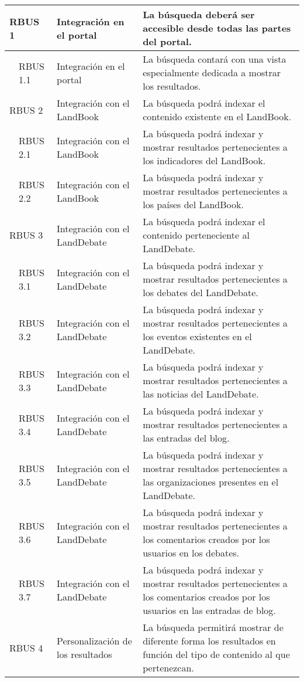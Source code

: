 \begin{longtable}[c]{|p{1mm}|p{14mm}|p{30mm}|p{90mm}|}
\multicolumn{2}{|l|}{RBUS 1}  & Integración en el portal & La búsqueda deberá ser accesible desde todas las partes del portal. \\
\hline
 & RBUS 1.1 & Integración en el portal & La búsqueda contará con una vista especialmente dedicada a mostrar los resultados. \\
\hline
\multicolumn{2}{|l|}{RBUS 2}  & Integración con el LandBook & La búsqueda podrá indexar el contenido existente en el LandBook. \\
\hline
& RBUS 2.1 & Integración con el LandBook & La búsqueda podrá indexar y mostrar resultados pertenecientes a los indicadores del LandBook. \\
\hline
& RBUS 2.2 & Integración con el LandBook & La búsqueda podrá indexar y mostrar resultados pertenecientes a los países del LandBook. \\
\hline
\multicolumn{2}{|l|}{RBUS 3}  & Integración con el LandDebate & La búsqueda podrá indexar el contenido perteneciente al LandDebate. \\
\hline
& RBUS 3.1 & Integración con el LandDebate & La búsqueda podrá indexar y mostrar resultados pertenecientes a los debates del LandDebate. \\
\hline
& RBUS 3.2 & Integración con el LandDebate & La búsqueda podrá indexar y mostrar resultados pertenecientes a los eventos existentes en el LandDebate. \\
\hline
& RBUS 3.3 & Integración con el LandDebate & La búsqueda podrá indexar y mostrar resultados pertenecientes a las noticias del LandDebate. \\
\hline
& RBUS 3.4 & Integración con el LandDebate & La búsqueda podrá indexar y mostrar resultados pertenecientes a las entradas del blog. \\
\hline
& RBUS 3.5 & Integración con el LandDebate & La búsqueda podrá indexar y mostrar resultados pertenecientes a las organizaciones presentes en el LandDebate. \\
\hline
& RBUS 3.6 & Integración con el LandDebate & La búsqueda podrá indexar y mostrar resultados pertenecientes a los comentarios creados por los usuarios en los debates. \\
\hline
& RBUS 3.7 & Integración con el LandDebate & La búsqueda podrá indexar y mostrar resultados pertenecientes a los comentarios creados por los usuarios en las entradas de blog. \\
\hline
\multicolumn{2}{|l|}{RBUS 4}  & Personalización de los resultados & La búsqueda permitirá mostrar de diferente forma los resultados en función del tipo de contenido al que pertenezcan. \\

\end{longtable}

